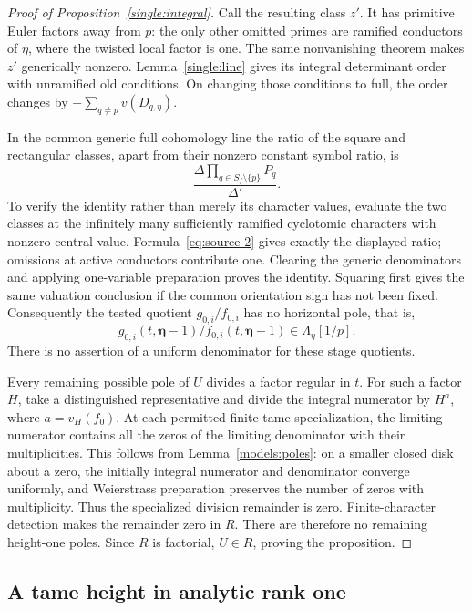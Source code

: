 \begin{proof}[Proof of Proposition~\ref{single:integral}]
Call the resulting class \(z'\).  It has primitive Euler factors
away from \(p\): the only other omitted primes are ramified
conductors of \(\eta\), where the twisted local factor is one.
The same nonvanishing theorem makes \(z'\) generically nonzero.
Lemma~\ref{single:line} gives its integral determinant order with
unramified old conditions.  On changing those conditions to full,
the order changes by
\(-\sum_{q\ne p}v(D_{q,\eta})\).

In the common generic full cohomology line the ratio of the
square and rectangular classes, apart from their nonzero
constant symbol ratio, is
\begin{equation}\label{single:class-ratio}
          \frac{\Delta\prod_{q\in S_f\setminus\{p\}}P_q}
               {\Delta'}.
\end{equation}
To verify the identity rather than merely its character values,
evaluate the two classes at the infinitely many sufficiently
ramified cyclotomic characters with nonzero central value.
Formula~\eqref{eq:source-2} gives exactly the displayed ratio;
omissions at active conductors contribute one.  Clearing the
generic denominators and applying one-variable preparation proves
the identity.  Squaring first gives the same valuation conclusion
if the common orientation sign has not been fixed.  Consequently
the tested quotient \(g_{0,i}/f_{0,i}\) has no horizontal pole,
that is,
\[
 g_{0,i}(t,\boldsymbol\eta-1)/f_{0,i}(t,\boldsymbol\eta-1)
                       \in\Lambda_\eta[1/p].
\]
There is no assertion of a uniform denominator for these stage
quotients.

Every remaining possible pole of \(U\) divides a factor regular
in \(t\).  For such a factor \(H\), take a distinguished
representative and divide the integral numerator by \(H^a\),
where \(a=v_H(f_0)\).  At each permitted finite tame
specialization, the limiting numerator contains all the zeros
of the limiting denominator with their multiplicities.  This
follows from Lemma~\ref{models:poles}: on a smaller closed disk about a zero,
the initially integral numerator and denominator converge
uniformly, and Weierstrass preparation preserves the number of
zeros with multiplicity.  Thus the specialized division
remainder is zero.  Finite-character detection makes the
remainder zero in \(R\).  There are therefore no remaining
height-one poles.  Since \(R\) is factorial, \(U\in R\), proving
the proposition.
\end{proof}

\subsection{A tame height in analytic rank one}

